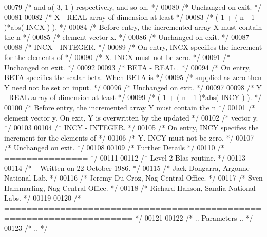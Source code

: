 \begin{DoxyCode}
00079 \textcolor{comment}{/*           and a( 3, 1 ) respectively, and so on. */}
00080 \textcolor{comment}{/*           Unchanged on exit. */}
00081 
00082 \textcolor{comment}{/*  X      - REAL             array of dimension at least */}
00083 \textcolor{comment}{/*           ( 1 + ( n - 1 )*abs( INCX ) ). */}
00084 \textcolor{comment}{/*           Before entry, the incremented array X must contain the n */}
00085 \textcolor{comment}{/*           element vector x. */}
00086 \textcolor{comment}{/*           Unchanged on exit. */}
00087 
00088 \textcolor{comment}{/*  INCX   - INTEGER. */}
00089 \textcolor{comment}{/*           On entry, INCX specifies the increment for the elements of */}
00090 \textcolor{comment}{/*           X. INCX must not be zero. */}
00091 \textcolor{comment}{/*           Unchanged on exit. */}
00092 
00093 \textcolor{comment}{/*  BETA   - REAL            . */}
00094 \textcolor{comment}{/*           On entry, BETA specifies the scalar beta. When BETA is */}
00095 \textcolor{comment}{/*           supplied as zero then Y need not be set on input. */}
00096 \textcolor{comment}{/*           Unchanged on exit. */}
00097 
00098 \textcolor{comment}{/*  Y      - REAL             array of dimension at least */}
00099 \textcolor{comment}{/*           ( 1 + ( n - 1 )*abs( INCY ) ). */}
00100 \textcolor{comment}{/*           Before entry, the incremented array Y must contain the n */}
00101 \textcolor{comment}{/*           element vector y. On exit, Y is overwritten by the updated */}
00102 \textcolor{comment}{/*           vector y. */}
00103 
00104 \textcolor{comment}{/*  INCY   - INTEGER. */}
00105 \textcolor{comment}{/*           On entry, INCY specifies the increment for the elements of */}
00106 \textcolor{comment}{/*           Y. INCY must not be zero. */}
00107 \textcolor{comment}{/*           Unchanged on exit. */}
00108 
00109 \textcolor{comment}{/*  Further Details */}
00110 \textcolor{comment}{/*  =============== */}
00111 
00112 \textcolor{comment}{/*  Level 2 Blas routine. */}
00113 
00114 \textcolor{comment}{/*  -- Written on 22-October-1986. */}
00115 \textcolor{comment}{/*     Jack Dongarra, Argonne National Lab. */}
00116 \textcolor{comment}{/*     Jeremy Du Croz, Nag Central Office. */}
00117 \textcolor{comment}{/*     Sven Hammarling, Nag Central Office. */}
00118 \textcolor{comment}{/*     Richard Hanson, Sandia National Labs. */}
00119 
00120 \textcolor{comment}{/*  ===================================================================== */}
00121 
00122 \textcolor{comment}{/*     .. Parameters .. */}
00123 \textcolor{comment}{/*     .. */}

\end{DoxyCode}
